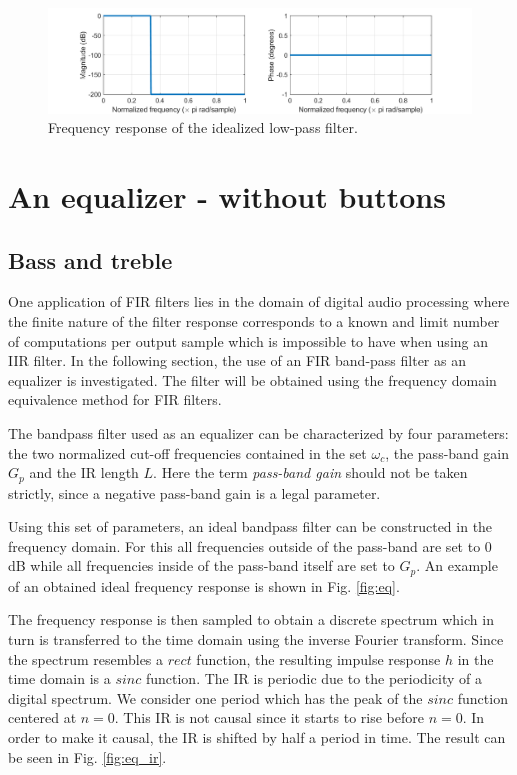 \documentclass[journal]{IEEEtran}
\begin{document}
\begin{figure}
    \centering
    \includegraphics[width=\columnwidth]{assignment_02/plots/freq_resp_lowpass_fir.png}
    \caption{Frequency response of the idealized low-pass filter.}
    \label{fig:freq_resp_lowpass}
\end{figure}


\newpage

\section{An equalizer - without buttons}
\subsection{Bass and treble}

One application of FIR filters lies in the domain of digital audio processing where the finite nature of the filter response corresponds to a known and limit number of computations per output sample which is impossible to have when using an IIR filter. In the following section, the use of an FIR band-pass filter as an equalizer is investigated. The filter will be obtained using the frequency domain equivalence method for FIR filters.

The bandpass filter used as an equalizer can be characterized by four parameters: the two normalized cut-off frequencies contained in the set $\omega_c$, the pass-band gain $G_p$ and the IR length $L$. Here the term \textit{pass-band gain} should not be taken strictly, since a negative pass-band gain is a legal parameter.

Using this set of parameters, an ideal bandpass filter can be constructed in the frequency domain. For this all frequencies outside of the pass-band are set to 0 dB while all frequencies inside of the pass-band itself are set to $G_p$. An example of an obtained ideal frequency response is shown in Fig. \ref{fig:eq}.

The frequency response is then sampled to obtain a discrete spectrum which in turn is transferred to the time domain using the inverse Fourier transform. Since the spectrum resembles a $rect$ function, the resulting impulse response $h$ in the time domain is a $sinc$ function. The IR is periodic due to the periodicity of a digital spectrum. We consider one period which has the peak of the $sinc$ function centered at $n=0$. This IR is not causal since it starts to rise before $n=0$. In order to make it causal, the IR is shifted by half a period in time. The result can be seen in Fig. \ref{fig:eq_ir}. 
\end{document}
